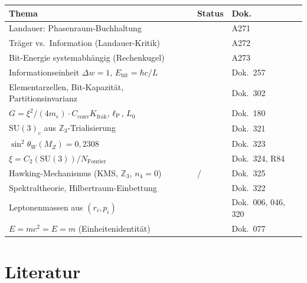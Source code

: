 \begin{center}\small
\begin{tabular}{@{}lll@{}}
  \toprule
  \textbf{Thema} & \textbf{Status} & \textbf{Dok.} \\
  \midrule
  Landauer: Phasenraum-Buchhaltung & \K & A271 \\
  Träger vs.\ Information (Landauer-Kritik) & \K & A272 \\
  Bit-Energie systemabhängig (Rechenkugel) & \K & A273 \\
  Informationseinheit $\Delta w = 1$, $E_{\mathrm{bit}} = \hbar c/L$ & \K & Dok.\ 257 \\
  Elementarzellen, Bit-Kapazität, Partitionsinvarianz & \K & Dok.\ 302 \\
  $G = \xi^2/(4m_e)\cdot C_{\text{conv}}K_{\text{frak}}$, $\ell_{\mathrm{P}}$, $L_0$ & \K & Dok.\ 180 \\
  $\mathrm{SU}(3)_c$ aus $\mathbb{Z}_3$-Trialisierung & \B & Dok.\ 321 \\
  $\sin^2\theta_W(M_Z) = 0{,}2308$ & \K & Dok.\ 323 \\
  $\xi = C_2(\mathrm{SU}(3))/N_{\mathrm{Fourier}}$ & \K & Dok.\ 324, R84 \\
  Hawking-Mechanismus (KMS, $\mathbb{Z}_3$, $n_4{=}0$) & \K/\B & Dok.\ 325 \\
  Spektraltheorie, Hilbertraum-Einbettung & \K & Dok.\ 322 \\
  Leptonenmassen aus $(r_i, p_i)$ & \K & Dok.\ 006, 046, 320 \\
  $E = mc^2 = E = m$ (Einheitenidentität) & \K & Dok.\ 077 \\
  \bottomrule
\end{tabular}
\end{center}

\section*{Literatur}

